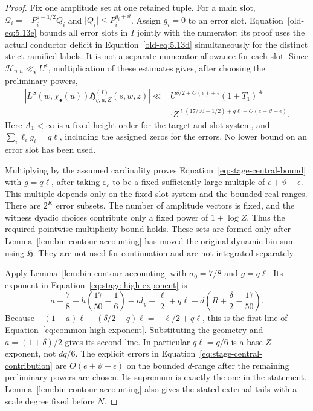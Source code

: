\begin{proof}
Fix one amplitude set at one retained tuple.  For a main slot,
\(\mathcal Q_i=-P_i^{z-1/2}Q_i\) and
\(\lvert Q_i\rvert\le P_i^{g_i+\vartheta}\).  Assign \(g_i=0\) to
an error slot.  Equation~\eqref{old-eq:5.13e} bounds all error slots
in \(I\) jointly with the numerator; its proof uses the actual
conductor deficit in Equation~\eqref{old-eq:5.13d} simultaneously
for the distinct strict ramified labels.  It is not a separate
numerator allowance for each slot.  Since
\(\mathcal H_{\eta,u}\ll_\epsilon U^\epsilon\), multiplication of
these estimates gives, after choosing the preliminary powers,
\[
 \begin{split}
 \left|L^S(w,\chi_\bullet(u))
       \mathfrak H_{\eta,u,Z}^{(I)}(s,w,z)\right|
 \ll{}&U^{\delta/2+O(e)+\epsilon}(1+T_1)^{A_1}\\
 &\cdot
 Z^{\ell(17/50-1/2)+q\ell+O(e+\vartheta+\epsilon)}.
 \end{split}
\]
Here \(A_1<\infty\) is a fixed height order for the target and slot
system, and \(\sum_i\ell_i g_i=q\ell\), including the assigned zeros
for the errors.  No lower bound on an error slot has been used.

Multiplying by the assumed cardinality proves
Equation~\eqref{eq:stage-central-bound} with \(g=q\ell\), after taking
\(\varepsilon_c\) to be a fixed sufficiently large multiple of
\(e+\vartheta+\epsilon\).  This multiple depends only on the fixed slot
system and the bounded real ranges.  There are \(2^K\) error subsets.
The number of amplitude vectors is fixed, and the witness dyadic choices
contribute only a fixed power of \(1+\log Z\).  Thus the required
pointwise multiplicity bound holds.  These sets are formed only after
Lemma~\ref{lem:bin-contour-accounting} has moved the original dynamic-bin
sum using
\(\mathfrak H\).  They are not used for continuation and are not
integrated separately.

Apply Lemma~\ref{lem:bin-contour-accounting} with \(\sigma_0=7/8\)
and \(g=q\ell\).  Its exponent in
Equation~\eqref{eq:stage-high-exponent} is
\[
 a-\frac78+h\left(\frac{17}{50}-\frac16\right)-a l_y-\frac{\ell}{2}
       +q\ell+d\left(R+\frac\delta2-\frac{17}{50}\right).
\]
Because
\(-(1-a)\ell-(\delta/2-q)\ell=-\ell/2+q\ell\),
this is the first line of Equation~\eqref{eq:common-high-exponent}.
Substituting the geometry and \(a=(1+\delta)/2\) gives its second line.
In particular \(q\ell=q/6\) is a base-\(Z\) exponent, not \(dq/6\).
The explicit errors in Equation~\eqref{eq:stage-central-contribution}
are \(O(e+\vartheta+\epsilon)\) on the bounded \(d\)-range after the
remaining preliminary powers are chosen.  Its supremum is exactly the
one in the statement.  Lemma~\ref{lem:bin-contour-accounting} also gives
the stated external tails
with a scale degree fixed before \(N\).
\end{proof}

